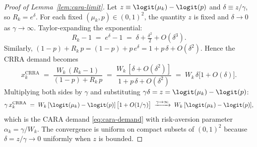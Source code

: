 \begin{proof}[Proof of Lemma~\ref{lem:cara-limit}]
Let $z\equiv\logit(\mu_{k})-\logit(p)$ and $\delta\equiv z/\gamma$, so
$R_{k}=e^{\delta}$. For each fixed $(\mu_{k},p)\in(0,1)^{2}$, the
quantity $z$ is fixed and $\delta\to 0$ as $\gamma\to\infty$.
Taylor-expanding the exponential:
\[
   R_{k}-1 \;=\; e^{\delta}-1
   \;=\; \delta+\tfrac{\delta^{2}}{2}+O(\delta^{3}).
\]
Similarly, $(1-p)+R_{k}\,p = (1-p)+p\,e^{\delta}
= 1 + p\,\delta + O(\delta^{2})$. Hence the CRRA demand becomes
\[
   x_{k}^{\mathrm{CRRA}}
   \;=\; \frac{W_{k}\,(R_{k}-1)}{(1-p)+R_{k}\,p}
   \;=\; \frac{W_{k}\,[\delta+O(\delta^{2})]}{1+p\,\delta+O(\delta^{2})}
   \;=\; W_{k}\,\delta\bigl[1+O(\delta)\bigr].
\]
Multiplying both sides by $\gamma$ and substituting
$\gamma\delta=z=\logit(\mu_{k})-\logit(p)$:
\[
   \gamma\,x_{k}^{\mathrm{CRRA}}
   \;=\; W_{k}\,[\logit(\mu_{k})-\logit(p)]\,\bigl[1+O(1/\gamma)\bigr]
   \;\xrightarrow{\gamma\to\infty}\;
   W_{k}\,[\logit(\mu_{k})-\logit(p)],
\]
which is the CARA demand \eqref{eq:cara-demand} with risk-aversion
parameter $\alpha_{k}=\gamma/W_{k}$. The convergence is uniform on
compact subsets of $(0,1)^{2}$ because $\delta=z/\gamma\to 0$ uniformly
when $z$ is bounded.
\end{proof}

